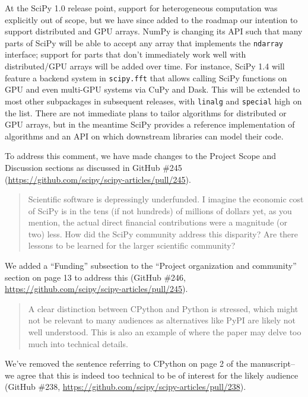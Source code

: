 \documentclass[10pt,stdletter,dateno]{newlfm}
\begin{document}
\begin{newlfm}
At the SciPy 1.0 release point, support for heterogeneous computation was explicitly out of scope, but we have since added to the roadmap our intention to support distributed and GPU arrays. NumPy is changing its API such that many parts of SciPy will be able to accept any array that implements the \texttt{ndarray} interface; support for parts that don't immediately work well with distributed/GPU arrays will be added over time. For instance, SciPy 1.4 will feature a backend system in \texttt{scipy.fft} that allows calling SciPy functions on GPU and even multi-GPU systems via CuPy and Dask. This will be extended to most other subpackages in subsequent releases, with \texttt{linalg} and \texttt{special} high on the list. There are not immediate plans to tailor algorithms for distributed or GPU arrays, but in the meantime SciPy provides a reference implementation of algorithms and an API on which downstream libraries can model their code.

To address this comment, we have made changes to the Project Scope and Discussion sections as discussed in GitHub \#245 (\url{https://github.com/scipy/scipy-articles/pull/245}).

\begin{quote}
Scientific software is depressingly underfunded. I imagine the economic cost of SciPy is in the tens (if not hundreds) of millions of dollars yet, as you mention, the actual direct financial contributions were a magnitude (or two) less. How did the SciPy community address this disparity? Are there lessons to be learned for the larger scientific community?
\end{quote}

We added a ``Funding'' subsection to the ``Project organization and community'' section on page 13 to address this (GitHub \#246, \url{https://github.com/scipy/scipy-articles/pull/245}). 

\begin{quote}
A clear distinction between CPython and Python is stressed, which might not be relevant to many audiences as alternatives like PyPI are likely not well understood. This is also an example of where the paper may delve too much into technical details.
\end{quote}

We've removed the sentence referring to CPython on page 2 of the manuscript--we agree that this is indeed too technical to be of interest for the likely audience (GitHub \#238, \url{https://github.com/scipy/scipy-articles/pull/238}). 


\end{newlfm}
\end{document}
